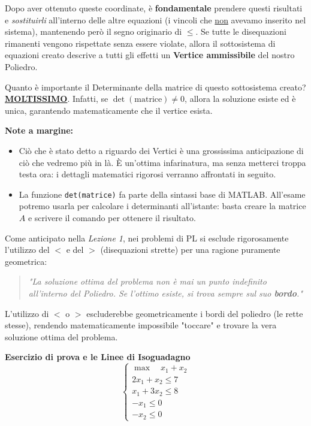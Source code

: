 \documentclass[12pt, a4paper]{article}
\newcommand{\separatore}{\noindent{\color{titlecolor!50}\rule{\textwidth}{0.6pt}}}
\begin{document}
	Dopo aver ottenuto queste coordinate, è \textbf{fondamentale} prendere questi risultati e \textit{sostituirli} all'interno delle altre equazioni (i vincoli che \underline{non} avevamo inserito nel sistema), mantenendo però il segno originario di $\leq$. Se tutte le disequazioni rimanenti vengono rispettate senza essere violate, allora il sottosistema di equazioni creato descrive a tutti gli effetti un \textbf{Vertice ammissibile} del nostro Poliedro.
	
	Quanto è importante il Determinante della matrice di questo sottosistema creato? \textbf{\underline{MOLTISSIMO}}. Infatti, se $\det(\text{matrice}) \neq 0$, allora la soluzione esiste ed è unica, garantendo matematicamente che il vertice esista.
	
	\textbf{Note a margine:}
	\begin{itemize}[label=-, itemsep=2pt, leftmargin=2cm]
		\item Ciò che è stato detto a riguardo dei Vertici è una grossissima anticipazione di ciò che vedremo più in là. È un'ottima infarinatura, ma senza metterci troppa testa ora: i dettagli matematici rigorosi verranno affrontati in seguito.
		\item La funzione \texttt{det(matrice)} fa parte della sintassi base di MATLAB. All'esame potremo usarla per calcolare i determinanti all'istante: basta creare la matrice $A$ e scrivere il comando per ottenere il risultato.
	\end{itemize}
	
	Come anticipato nella \textit{Lezione 1}, nei problemi di PL si esclude rigorosamente l'utilizzo del $<$ e del $>$ (disequazioni strette) per una ragione puramente geometrica:
	\begin{quote}
		\textit{"La soluzione ottima del problema non è mai un punto indefinito all'interno del Poliedro. Se l'ottimo esiste, si trova sempre sul suo \textbf{bordo}."}
	\end{quote}
	L'utilizzo di $<$ o $>$ escluderebbe geometricamente i bordi del poliedro (le rette stesse), rendendo matematicamente impossibile "toccare" e trovare la vera soluzione ottima del problema.
	
	\vspace{0.6cm}
	\separatore
	\vspace{0.4cm}
	
	\textbf{Esercizio di prova e le Linee di Isoguadagno}
	\[
	\begin{cases}
		\max \quad x_1 + x_2 \\
		2x_1 + x_2 \leq 7 \\
		x_1 + 3x_2 \leq 8 \\
		-x_1 \leq 0 \\
		-x_2 \leq 0
	\end{cases}
	\]
	
\end{document}

